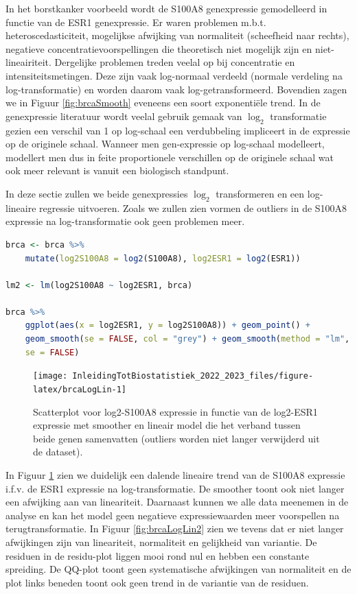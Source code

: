 \documentclass[
  12pt,dutch,coursenotes]{book}
\begin{document}
In het borstkanker voorbeeld wordt de S100A8 genexpressie gemodelleerd in functie van de ESR1 genexpressie. Er waren problemen m.b.t. heteroscedasticiteit, mogelijkse afwijking van normaliteit (scheefheid naar rechts), negatieve concentratievoorspellingen die theoretisch niet mogelijk zijn en niet-lineairiteit. Dergelijke problemen treden veelal op bij concentratie en intensiteitsmetingen. Deze zijn vaak log-normaal verdeeld (normale verdeling na log-transformatie) en worden daarom vaak log-getransformeerd.
Bovendien zagen we in Figuur \ref{fig:brcaSmooth} eveneens een soort exponentiële trend.
In de genexpressie literatuur wordt veelal gebruik gemaak van \(\log_2\) transformatie gezien een verschil van 1 op log-schaal een verdubbeling impliceert in de expressie op de originele schaal.
Wanneer men gen-expressie op log-schaal modelleert, modellert men dus in feite proportionele verschillen op de originele schaal wat ook meer relevant is vanuit een biologisch standpunt.

In deze sectie zullen we beide genexpressies \(\log_2\) transformeren en een log-lineaire regressie uitvoeren. Zoals we zullen zien vormen de outliers in de S100A8 expressie na log-transformatie ook geen problemen meer.

\begin{lstlisting}[language=R]
brca <- brca %>%
    mutate(log2S100A8 = log2(S100A8), log2ESR1 = log2(ESR1))

lm2 <- lm(log2S100A8 ~ log2ESR1, brca)

brca %>%
    ggplot(aes(x = log2ESR1, y = log2S100A8)) + geom_point() +
    geom_smooth(se = FALSE, col = "grey") + geom_smooth(method = "lm",
    se = FALSE)
\end{lstlisting}

\begin{figure}

{\centering \texttt{[image: InleidingTotBiostatistiek\_2022\_2023\_files/figure-latex/brcaLogLin-1]} 

}

\caption{Scatterplot voor log2-S100A8 expressie in functie van de log2-ESR1 expressie met smoother en lineair model die het verband tussen beide genen samenvatten (outliers worden niet langer verwijderd uit de dataset).}\label{fig:brcaLogLin}
\end{figure}

In Figuur \ref{fig:brcaLogLin} zien we duidelijk een dalende lineaire trend van de S100A8 expressie i.f.v. de ESR1 expressie na log-transformatie.
De smoother toont ook niet langer een afwijking aan van lineariteit.
Daarnaast kunnen we alle data meenemen in de analyse en kan het model geen negatieve expressiewaarden meer voorspellen na terugtransformatie.
In Figuur \ref{fig:brcaLogLin2} zien we tevens dat er niet langer afwijkingen zijn van lineariteit, normaliteit en gelijkheid van variantie.
De residuen in de residu-plot liggen mooi rond nul en hebben een constante spreiding.
De QQ-plot toont geen systematische afwijkingen van normaliteit en de plot links beneden toont ook geen trend in de variantie van de residuen.
\end{document}
